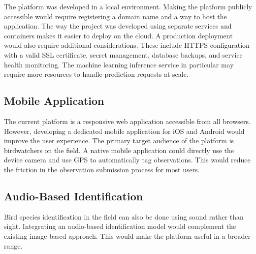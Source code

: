 The platform was developed in a local environment. Making the platform publicly accessible would require registering a domain name and a way to host the application. The way the project was developed using separate services and containers makes it easier to deploy on the cloud.
A production deployment would also require additional considerations. These include HTTPS configuration with a valid SSL certificate, secret management, database backups, and service health monitoring. The machine learning inference service in particular may require more resources to handle prediction requests at scale.

\subsection{Mobile Application}

The current platform is a responsive web application accessible from all browsers. However, developing a dedicated mobile application for iOS and Android would improve the user experience. The primary target audience of the platform is birdwatchers on the field. A native mobile application could directly use the device camera and use GPS to automatically tag observations. 
This would reduce the friction in the observation submission process for most users.

\subsection{Audio-Based Identification}

Bird species identification in the field can also be done using sound rather than sight. Integrating an audio-based identification model would complement the existing image-based approach. 
This would make the platform useful in a broader range.

\clearpage